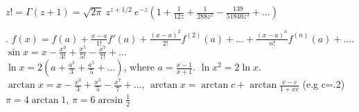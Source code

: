 

$z! = \Gamma(z+1) = \sqrt{2 \pi}\ z^{z+1/2}\ e^{-z}
(1 + \frac{1}{12z} + \frac{1}{288 z^2} - \frac{139}{51840 z^3} + \dots)$

.
$f(x) = f(a) + \frac{x-a}{1!} f'(a) + \frac{(x-a)^2}{2!} f^{(2)}(a) + \dots + \frac{(x-a)^n}{n!} f^{(n)}(a) + \dots$. \\
$\sin x = x - \frac{x^3}{3!} + \frac{x^5}{5!} - \frac{x^7}{7!} + \dots$ \\
$\ln x = 2(a+\frac{a^3}{3}+\frac{a^5}{5}+\dots)$, where $a=\frac{x-1}{x+1}$. $\ln x^2 = 2 \ln x$. \\
$\arctan x = x - \frac{x^3}{3} + \frac{x^5}{5} - \frac{x^7}{7} + \dots$,
$\arctan x = \arctan c + \arctan \frac{x-c}{1+xc}$ (e.g c=.2) \\
$\pi = 4 \arctan 1$, $\pi = 6 \arcsin \frac{1}{2}$

